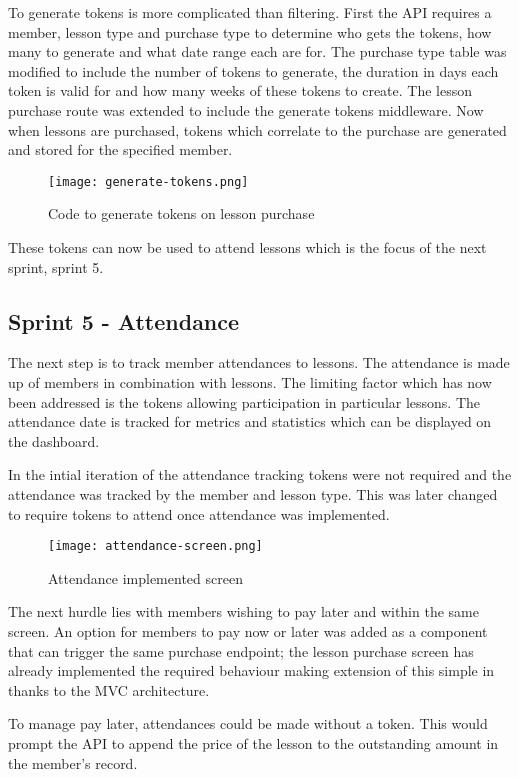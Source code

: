 To generate tokens is more complicated than filtering. First the API requires a member, lesson type and purchase type to determine who gets the tokens, how many to generate and what date range each are for. The purchase type table was modified to include the number of tokens to generate, the duration in days each token is valid for and how many weeks of these tokens to create. The lesson purchase route was extended to include the generate tokens middleware. Now when lessons are purchased, tokens which correlate to the purchase are generated and stored for the specified member. 

\begin{figure}[ht!]
    \centerline{\texttt{[image: generate-tokens.png]}}
    \caption{Code to generate tokens on lesson purchase}
    \label{fig:purchase-gen-tokens}
\end{figure}

These tokens can now be used to attend lessons which is the focus of the next sprint, sprint 5.

\subsection{Sprint 5 - Attendance}
The next step is to track member attendances to lessons. The attendance is made up of members in combination with lessons. The limiting factor which has now been addressed is the tokens allowing participation in particular lessons. The attendance date is tracked for metrics and statistics which can be displayed on the dashboard.

In the intial iteration of the attendance tracking tokens were not required and the attendance was tracked by the member and lesson type. This was later changed to require tokens to attend once attendance was implemented.

\begin{figure}[ht!]
    \centerline{\texttt{[image: attendance-screen.png]}}
    \caption{Attendance implemented screen}
    \label{fig:attendance-screen}
\end{figure}

The next hurdle lies with members wishing to pay later and within the same screen. An option for members to pay now or later was added as a component that can trigger the same purchase endpoint; the lesson purchase screen has already implemented the required behaviour making extension of this simple in thanks to the MVC architecture.

To manage pay later, attendances could be made without a token. This would prompt the API to append the price of the lesson to the outstanding amount in the member's record.


